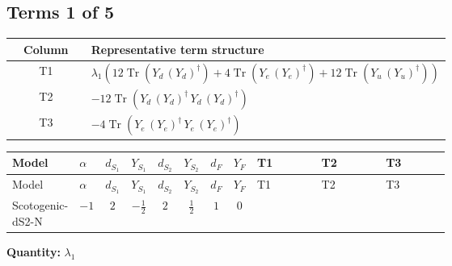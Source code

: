 \documentclass[8pt]{article}
\begin{document}
\begin{landscape}
\subsection*{Terms 1 of 5}
\begin{center}
\begin{tabular}{@{}c >{\raggedright\arraybackslash}p{0.82\linewidth}@{}}
\toprule
Column & Representative term structure \\
\midrule
T1 & \(\displaystyle {\lambda_1} (12 \operatorname{Tr}\!\left({Y_d}\,\left({Y_d}\right)^{\dagger}\right)+4 \operatorname{Tr}\!\left({Y_e}\,\left({Y_e}\right)^{\dagger}\right)+12 \operatorname{Tr}\!\left({Y_u}\,\left({Y_u}\right)^{\dagger}\right))\) \\
\midrule
T2 & \(\displaystyle -12 \operatorname{Tr}\!\left({Y_d}\,\left({Y_d}\right)^{\dagger}\,{Y_d}\,\left({Y_d}\right)^{\dagger}\right)\) \\
\midrule
T3 & \(\displaystyle -4 \operatorname{Tr}\!\left({Y_e}\,\left({Y_e}\right)^{\dagger}\,{Y_e}\,\left({Y_e}\right)^{\dagger}\right)\) \\
\midrule
\bottomrule
\end{tabular}
\end{center}
\smallskip
\tiny
\begin{longtable}{@{}llcccccc >{\raggedright\arraybackslash}p{0.21\linewidth} >{\raggedright\arraybackslash}p{0.21\linewidth} >{\raggedright\arraybackslash}p{0.21\linewidth}@{}}
\toprule
Model & $\alpha$ & $d_{S_1}$ & $Y_{S_1}$ & $d_{S_2}$ & $Y_{S_2}$ & $d_F$ & $Y_F$ & T1 & T2 & T3 \\
\midrule
\endfirsthead
\toprule
Model & $\alpha$ & $d_{S_1}$ & $Y_{S_1}$ & $d_{S_2}$ & $Y_{S_2}$ & $d_F$ & $Y_F$ & T1 & T2 & T3 \\
\midrule
\endhead
Scotogenic-dS2-N & $-1$ & $2$ & $-\frac{1}{2}$ & $2$ & $\frac{1}{2}$ & $1$ & $0$ & \scriptsize\adjustbox{max width=\linewidth}{$\begin{gathered} {\lambda_1} (12 \operatorname{Tr}\!\left({Y_d}\,\left({Y_d}\right)^{\dagger}\right)+4 \operatorname{Tr}\!\left({Y_e}\,\left({Y_e}\right)^{\dagger}\right)+12 \operatorname{Tr}\!\left({Y_u}\,\left({Y_u}\right)^{\dagger}\right))\end{gathered}$} & \scriptsize\adjustbox{max width=\linewidth}{$\begin{gathered} -12 \operatorname{Tr}\!\left({Y_d}\,\left({Y_d}\right)^{\dagger}\,{Y_d}\,\left({Y_d}\right)^{\dagger}\right)\end{gathered}$} & \scriptsize\adjustbox{max width=\linewidth}{$\begin{gathered} -4 \operatorname{Tr}\!\left({Y_e}\,\left({Y_e}\right)^{\dagger}\,{Y_e}\,\left({Y_e}\right)^{\dagger}\right)\end{gathered}$} \\
\midrule
\bottomrule
\end{longtable}
\clearpage
\noindent\textbf{Quantity: }$\lambda_1$\par\smallskip

\end{landscape}
\end{document}
